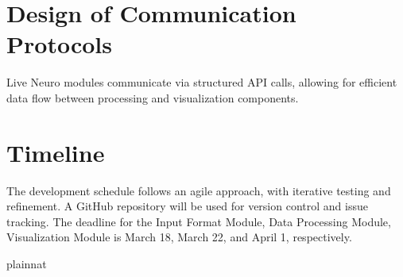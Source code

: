 \documentclass[12pt, titlepage]{article}
\begin{document}
\section{Design of Communication Protocols}

Live Neuro modules communicate via structured API calls, allowing for efficient data flow between processing and visualization components.



\section{Timeline}

The development schedule follows an agile approach, with iterative testing and refinement. A GitHub repository will be used for version control and issue tracking.
The deadline for the Input Format Module, Data Processing Module, Visualization Module is March 18, March 22, and April 1, respectively.


 {plainnat}


\newpage{}
\end{document}
